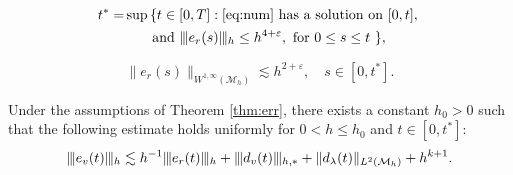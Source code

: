\documentclass[10pt,a4paper]{amsart}
\newcommand{\Man}{\mathcal{M}}
\newcommand{\normt}[1]{%
	\vert\kern-0.9pt\vert\kern-0.9pt\vert #1
	\vert\kern-0.9pt\vert\kern-0.9pt\vert}
\begin{document}
\begin{equation}\label{eq:t*} 
\begin{split}
    t^*=&\sup\left\{ t \in [0, T]: \eqref{eq:num} \text{ has a solution on } [0,t],  \right. \\
     &\quad\quad \text{and } \normt{e_r(s)}_h \leq h^{4 + \varepsilon}, \text{ for } 0 \leq s \leq t\ \},
\end{split} 
\end{equation}

\begin{equation}\label{eq:t*:cor}
    \|  e_{r}(s) \|_{W^{1,\infty}(\Man_h)}\lesssim h^{2+\varepsilon}, \quad s \in [0,t^*].
\end{equation}

\begin{lemma}[Estimate of \( e_v \)]\label{lm:esti_ev}
    Under the assumptions of Theorem \ref{thm:err}, there exists a constant $h_0 > 0$ such that the following estimate holds uniformly for $0<h\leq h_0$ and $t\in[0,t^{*}]${\rm:}
    \[
    \normt{e_v(t) }_h\lesssim h^{-1} \normt{e_r(t)}_h + \normt{d_v(t)}_{h,*} + \|d_\lambda(t)\|_{L^2(\Man_h)} + h^{k+1}.
    \]
\end{lemma}
\end{document}
